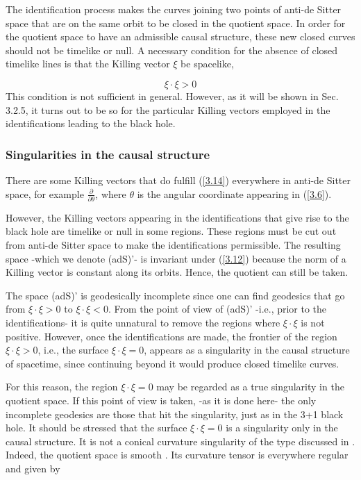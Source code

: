 \documentclass[12pt]{article}
\newcounter{c1} \newcounter{c2}
\newcommand{\bb}{\begin{equation}}
\newcommand{\ee}{\end{equation}}
\newcommand{\p}{\partial}
\begin{document}
The identification process makes the curves joining two points
of anti-de Sitter space that are on the same orbit to be closed
in the quotient space. In order for the quotient space to have an
admissible causal structure, these new closed curves should not
be timelike or null. A necessary condition for the absence of closed
timelike lines is that the Killing vector $\xi$ be spacelike,

\bb
\xi \cdot \xi >0
\label{3.14}
\ee
%
This condition is not sufficient in general. However, as it
will be shown in Sec. 3.2.5, it turns out to be so for the
particular Killing vectors employed in the identifications
leading to the black hole.


\subsubsection{Singularities in the causal structure}

There are some Killing vectors that do fulfill (\ref{3.14})
everywhere in anti-de Sitter space, for example $\frac{\p}{\p
\theta}$, where $\theta$ is the angular coordinate appearing in
(\ref{3.6}).

However, the Killing vectors appearing in the identifications
that give rise to the black hole are timelike or null in some
regions.  These regions must be cut out from anti-de Sitter
space to make the identifications permissible. The resulting
space -which we denote (adS)'- is invariant under (\ref{3.12})
because the norm of a Killing vector is constant along its
orbits. Hence, the quotient can still be taken.

The space (adS)' is geodesically incomplete since one can find
geodesics that go from $\xi \cdot \xi >0$ to  $\xi \cdot
\xi <0$.  From the point of view of (adS)' -i.e., prior to the
identifications- it is quite unnatural to remove the regions
where  $\xi \cdot \xi$ is not positive. However, once the
identifications are made, the frontier of the region $\xi \cdot
\xi >0$, i.e., the surface $\xi \cdot \xi =0$, appears as a
singularity in the causal structure of spacetime, since
continuing beyond it would produce closed timelike curves.

For this reason, the region $\xi \cdot \xi =0$ may be
regarded as a true singularity in the quotient space. If this
point of view is taken, -as it is done here- the only incomplete
geodesics are those that hit the singularity, just as in the 3+1
black hole. It should be stressed that the surface $\xi \cdot
\xi =0$ is a singularity only in the causal structure. It is not
a conical curvature singularity of the type discussed in
\cite{7}.  Indeed, the quotient space is  smooth \cite{8}.  Its
curvature tensor is everywhere regular and given by
\end{document}
